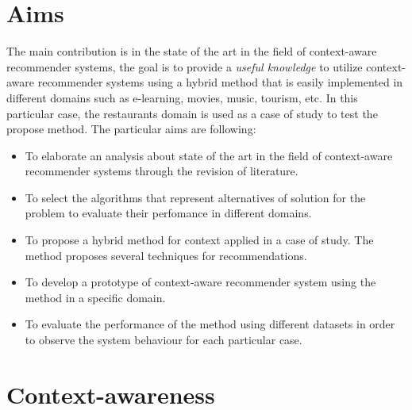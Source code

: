 \section{Aims}

The main contribution is in the state of the art in the field of
context-aware recommender systems, the goal is to provide a
\textit{useful knowledge} to utilize context-aware recommender systems
using a hybrid method that is easily implemented in different domains
such as e-learning, movies, music, tourism, etc. In this particular
case, the restaurants domain is used as a case of study to  test the
propose method. The particular aims are following:
\begin{itemize}  
\item To elaborate an analysis about state of the art in the field
of context-aware recommender systems through  the revision of
literature. 
\item To select the algorithms that represent alternatives of 
solution for the problem to evaluate their perfomance in different domains.
\item To propose a hybrid method for context applied in a case of study.  The method proposes several techniques for recommendations.
\item To develop a prototype of context-aware recommender system 
using the method in a specific domain.
\item To evaluate the performance of the method using 
different datasets in order to observe the system behaviour 
for each particular case.
\end{itemize} 

\section{Context-awareness}

